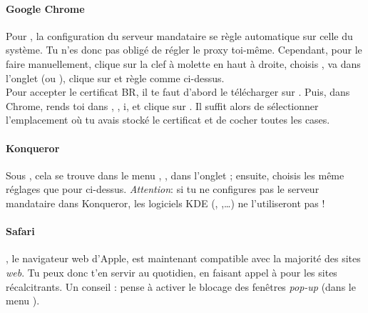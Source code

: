 


\paragraph{Google Chrome}

Pour , la configuration du serveur mandataire se r\`egle automatique sur celle du système. Tu n'es donc pas obligé de régler le proxy toi-même. Cependant, pour le faire manuellement, clique sur la
clef à molette en haut à droite, choisis , va dans l'onglet  (ou ), clique sur  et règle comme ci-dessus.\\

Pour accepter le certificat BR, il te faut d'abord le t\'el\'echarger sur . Puis, dans Chrome, rends toi dans , , i,  et clique sur . Il suffit alors de s\'electionner l'emplacement o\`u tu avais stock\'e le certificat et de cocher toutes les cases.

\paragraph{Konqueror}

Sous , cela se trouve dans le menu , ,
dans l'onglet  ; ensuite, choisis les même réglages que pour  ci-dessus. \emph{Attention}: si tu ne configures pas le serveur mandataire dans Konqueror,
les logiciels KDE (, ,\dots) ne l'utiliseront pas !

\paragraph{Safari}

, le navigateur web d'Apple, est maintenant compatible avec la majorit\'e des sites \emph{web}. Tu peux donc t'en servir au quotidien,
en faisant appel \`a   pour les sites r\'ecalcitrants. Un conseil : pense \`a  activer le blocage des fen\^etres \emph{pop-up} (dans le menu ). \\


